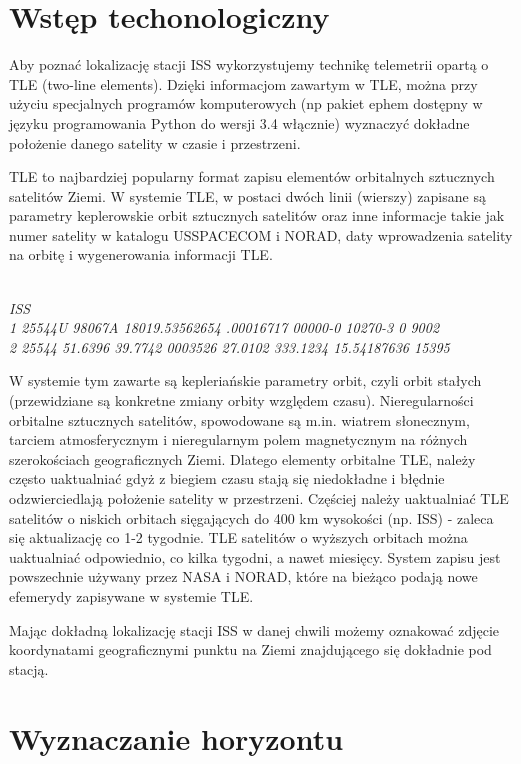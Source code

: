 \section{Wstęp techonologiczny}\label{sec:geolocalisation_introduction}

Aby poznać lokalizację stacji ISS wykorzystujemy technikę telemetrii opartą o TLE (two-line elements).
Dzięki informacjom zawartym w TLE, można przy użyciu specjalnych programów komputerowych
(np pakiet ephem dostępny w języku programowania Python do wersji 3.4 włącznie)
wyznaczyć dokładne położenie danego satelity w czasie i przestrzeni.

TLE to najbardziej popularny format zapisu elementów orbitalnych sztucznych satelitów Ziemi.
W systemie TLE, w postaci dwóch linii (wierszy) zapisane są parametry keplerowskie orbit
sztucznych satelitów oraz inne informacje takie jak numer satelity w katalogu USSPACECOM
i NORAD, daty wprowadzenia satelity na orbitę i wygenerowania informacji TLE.

\noindent \textit{
\\
ISS \\
1 25544U 98067A 18019.53562654 .00016717 00000-0 10270-3 0 9002 \\
2 25544 51.6396 39.7742 0003526 27.0102 333.1234 15.54187636 15395 \\
}

W systemie tym zawarte są kepleriańskie parametry orbit, czyli orbit stałych (przewidziane
są konkretne zmiany orbity względem czasu). Nieregularności orbitalne sztucznych satelitów,
spowodowane są m.in. wiatrem słonecznym, tarciem atmosferycznym i nieregularnym polem
magnetycznym na różnych szerokościach geograficznych Ziemi. Dlatego elementy orbitalne TLE,
należy często uaktualniać gdyż z biegiem czasu stają się niedokładne i błędnie odzwierciedlają
położenie satelity w przestrzeni. Częściej należy uaktualniać TLE satelitów o niskich orbitach
sięgających do 400 km wysokości (np. ISS) - zaleca się aktualizację co 1-2 tygodnie. TLE satelitów
o wyższych orbitach można uaktualniać odpowiednio, co kilka tygodni, a nawet miesięcy.
System zapisu jest powszechnie używany przez NASA i NORAD, które na bieżąco podają nowe
efemerydy zapisywane w systemie TLE.

Mając dokładną lokalizację stacji ISS w danej chwili możemy oznakować zdjęcie koordynatami
geograficznymi punktu na Ziemi znajdującego się dokładnie pod stacją.

\section{Wyznaczanie horyzontu}\label{sec:geolocalisation_horizon}

